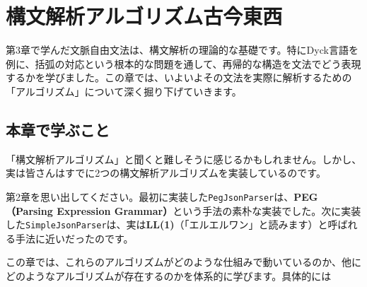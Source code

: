 \chapter{構文解析アルゴリズム古今東西}\label{ch04}

第3章で学んだ文脈自由文法は、構文解析の理論的な基礎です。特にDyck言語を例に、括弧の対応という根本的な問題を通して、再帰的な構造を文法でどう表現するかを学びました。この章では、いよいよその文法を実際に解析するための「アルゴリズム」について深く掘り下げていきます。

\section{本章で学ぶこと}

「構文解析アルゴリズム」と聞くと難しそうに感じるかもしれません。しかし、実は皆さんはすでに2つの構文解析アルゴリズムを実装しているのです。

第2章を思い出してください。最初に実装した\texttt{PegJsonParser}は、\textbf{\sffamily PEG（Parsing
Expression
Grammar）}という手法の素朴な実装でした。次に実装した\texttt{SimpleJsonParser}は、実は\textbf{\sffamily LL(1)}（「エルエルワン」と読みます）と呼ばれる手法に近いだったのです。

この章では、これらのアルゴリズムがどのような仕組みで動いているのか、他にどのようなアルゴリズムが存在するのかを体系的に学びます。具体的には

